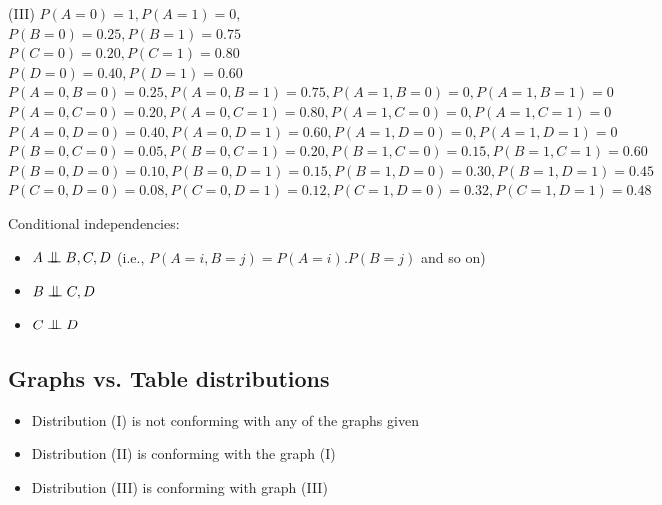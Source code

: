 \documentclass[fleqn]{article}
\newcommand{\bigCI}{\mathrel{\text{\scalebox{1.07}{$\perp\mkern-10mu\perp$}}}}
\begin{document}
\noindent(III)
{
\small
 $P(A=0) = 1, P(A=1) = 0, $\\
\hspace*{1em} $P(B=0) = 0.25, P(B=1) = 0.75$\\
\hspace*{1em} $P(C=0) = 0.20, P(C=1) = 0.80$\\
\hspace*{1em} $P(D=0) = 0.40, P(D=1) = 0.60$\\
\hspace*{1em} $P(A=0, B=0) = 0.25, P(A=0, B=1) = 0.75, P(A=1, B=0) = 0, P(A=1, B=1) = 0$\\
\hspace*{1em} $P(A=0, C=0) = 0.20, P(A=0, C=1) = 0.80, P(A=1, C=0) = 0, P(A=1, C=1) = 0$\\
\hspace*{1em} $P(A=0, D=0) = 0.40, P(A=0, D=1) = 0.60, P(A=1, D=0) = 0, P(A=1, D=1) = 0$\\
\hspace*{1em} $P(B=0, C=0) = 0.05, P(B=0, C=1) = 0.20, P(B=1, C=0) = 0.15, P(B=1, C=1) = 0.60$\\
\hspace*{1em} $P(B=0, D=0) = 0.10, P(B=0, D=1) = 0.15, P(B=1, D=0) = 0.30, P(B=1, D=1) = 0.45$\\
\hspace*{1em} $P(C=0, D=0) = 0.08, P(C=0, D=1) = 0.12, P(C=1, D=0) = 0.32, P(C=1, D=1) = 0.48$\\
}

Conditional independencies:

\begin{itemize}
  \item $A \bigCI B, C, D$ (i.e., $P(A=i, B=j) = P(A=i).P(B=j)$ and so on)
  \item $B \bigCI C, D$
  \item $C \bigCI D$
\end{itemize}

\subsection*{Graphs vs. Table distributions}
\begin{itemize}
  \item Distribution (I) is not conforming with any of the graphs given
  \item Distribution (II) is conforming with the graph (I)
  \item Distribution (III) is conforming with graph (III)
\end{itemize}
\end{document}
